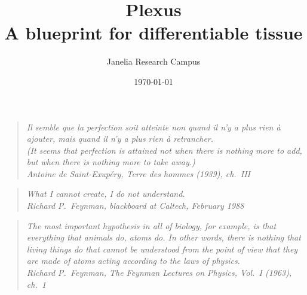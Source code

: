 \documentclass[11pt]{article}
\title{\textbf{Plexus}\\[3pt]
\large A blueprint for differentiable tissue}
\author{Janelia Research Campus}
\date{\today}
\begin{document}
\maketitle

\begin{quote}
\itshape
Il semble que la perfection soit atteinte non quand il n'y a plus rien \`a ajouter,
mais quand il n'y a plus rien \`a retrancher.\\[2pt]
(It seems that perfection is attained not when there is nothing more to add,
but when there is nothing more to take away.)
\upshape\\[2pt]
\footnotesize Antoine de Saint-Exup\'ery, \emph{Terre des hommes} (1939), ch.~III
\end{quote}

\begin{quote}
\itshape
What I cannot create, I do not understand.
\upshape\\[2pt]
\footnotesize Richard P.~Feynman, blackboard at Caltech, February 1988
\end{quote}

\begin{quote}
\itshape
The most important hypothesis in all of biology, for example, is that everything that
animals do, atoms do. In other words, there is nothing that living things do that cannot
be understood from the point of view that they are made of atoms acting according to the
laws of physics.
\upshape\\[2pt]
\footnotesize Richard P.~Feynman, \emph{The Feynman Lectures on Physics}, Vol.~I (1963), ch.~1
\end{quote}
\end{document}
